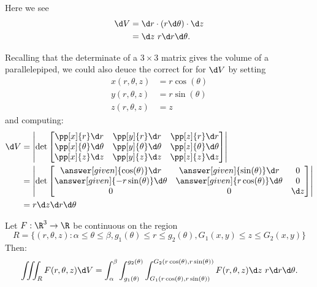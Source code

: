 \documentclass{ximera}
\begin{document}
\begin{image}
  \end{image}
Here we see 
\begin{align*}
\d V &= \d r \cdot (r \d \theta)\cdot \d z \\
&= \d z\ r \d r \d \theta.
\end{align*}

\begin{remark}
Recalling that the determinate of a $3\times 3$ matrix gives the volume of a parallelepiped, we could also deuce the correct for for $\d V$ by setting
\begin{align*}
  x(r,\theta,z) &= r \cos(\theta)\\
  y(r,\theta,z) &= r \sin(\theta)\\
  z(r,\theta,z) &= z
\end{align*}
and computing:
\begin{align*}
  \d V &= \left| \det
  \begin{bmatrix}
    \pp[x]{r} \d r & \pp[y]{r} \d r & \pp[z]{r} \d r\\
    \pp[x]{\theta} \d \theta & \pp[y]{\theta} \d \theta & \pp[z]{\theta} \d \theta\\
    \pp[x]{z} \d z & \pp[y]{z} \d z & \pp[z]{z} \d z
  \end{bmatrix}
  \right|\\
  &= \left| \det
  \begin{bmatrix}
    \answer[given]{\cos(\theta)} \d r & \answer[given]{\sin(\theta)} \d r & 0 \\
    \answer[given]{-r\sin(\theta)} \d \theta & \answer[given]{r\cos(\theta)} \d \theta & 0\\
    0 & 0 & \d z
  \end{bmatrix}
  \right|\\
  &= r \d z\d r \d \theta
\end{align*}
\end{remark}

\begin{theorem}[Fubini]
  Let $F:\R^3\to\R$ be continuous on the region
  \[
  R=\{(r,\theta,z):\alpha\leq\theta\leq\beta, g_1(\theta)\leq r\leq g_2(\theta), G_1(x,y)\le z\le G_2(x,y)\}
  \]
  Then: 
  \[
  \iiint_R F(r,\theta,z)\d V = \int_\alpha^\beta\int_{g_1(\theta)}^{g_2(\theta)} \int_{G_1(r\cos(\theta),r\sin(\theta))}^{G_2(r\cos(\theta),r\sin(\theta))}F(r,\theta,z) \d z \ r\d r\d \theta.
  \]
\end{theorem}
\end{document}
